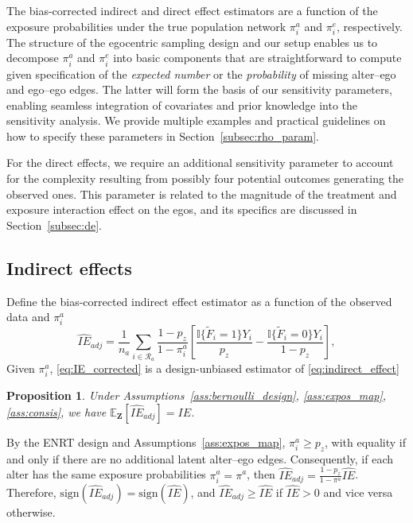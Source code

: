 \documentclass[11pt]{article}
\newtheorem{proposition}{Proposition}
\theoremstyle{definition}
\def \bZ {\boldsymbol{Z}}
\def \cR {\mathcal{R}}
\def \EX {\mathbb{E}}
\begin{document}
 The bias-corrected indirect and direct effect estimators are a function of the
exposure probabilities under the true population network $\pi_i^a$ and $\pi_i^e$, respectively.
The structure of the egocentric sampling design and our setup 
enables us to decompose $\pi_i^a$ and $\pi_i^e$ into basic
 components that are straightforward to compute given specification
  of the \emph{expected number} or the \emph{probability} of missing alter--ego and ego--ego edges.
 The latter will form the basis of our sensitivity parameters, 
 enabling seamless integration of covariates and prior knowledge into the sensitivity analysis.
 We provide multiple examples and practical guidelines on how to specify these parameters in Section~\ref{subsec:rho_param}.
 
 For the direct effects, we require an additional sensitivity parameter 
    to account for the complexity resulting from possibly four potential
     outcomes generating the observed ones.
This parameter is related to the magnitude of the treatment and exposure interaction effect on the egos,
and its specifics are discussed in Section~\ref{subsec:de}.


\subsection{Indirect effects}
\label{subsec:ie}
Define the bias-corrected indirect effect estimator as a function of the observed data and $\pi_i^a$
\begin{equation}
    \label{eq:IE_corrected}
    \widehat{IE}_{adj} = 
    \frac{1}{n_a}
    \sum_{i \in \cR_a}
    \frac{1-p_z}{1-\pi_i^a}
    \left[
    \frac{
    \mathbb{I}\{\widetilde{F}_i=1\}Y_i}{p_z} 
    -
    \frac{
    \mathbb{I}\{\widetilde{F}_i=0\}Y_i}{1 - p_z} 
    \right],
\end{equation}
Given $\pi_i^a$, \eqref{eq:IE_corrected} is a design-unbiased estimator of \eqref{eq:indirect_effect}
\begin{proposition}
\label{prop:ie_sa}
  Under Assumptions~\ref{ass:bernoulli_design}, \ref{ass:expos_map}, \ref{ass:consis}, we have
  $\EX_{\bZ}\left[\widehat{IE}_{adj} \right] = IE$.
\end{proposition}
By the ENRT design and Assumptions~\ref{ass:expos_map}, $\pi_i^a \geq p_z$,
 with equality if and only if there are no additional latent alter--ego edges.
 Consequently, if each alter has the same exposure probabilities $\pi^a_i = \pi^a$,
 then $\widehat{IE}_{adj} = \frac{1-p_z}{1-\pi^a} \widehat{IE}$.
 Therefore, $\text{sign}\left(\widehat{IE}_{adj}\right) = \text{sign}\left(\widehat{IE}\right)$, 
 and $\widehat{IE}_{adj} \geq \widehat{IE}$ if $\widehat{IE} >0$ and vice versa otherwise.
\end{document}
